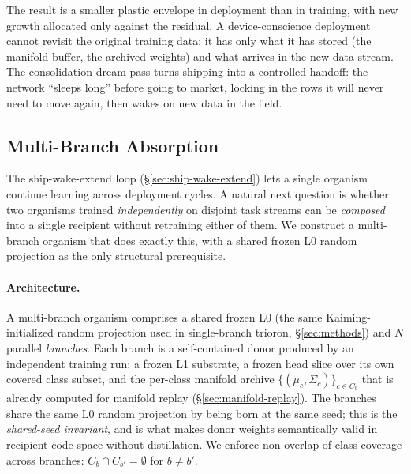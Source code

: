 \documentclass[11pt]{article}
\begin{document}
The result is a smaller plastic envelope in deployment than in training,
with new growth allocated only against the residual. A device-conscience
deployment cannot revisit the original training data: it has only what it
has stored (the manifold buffer, the archived weights) and what arrives in
the new data stream. The consolidation-dream pass turns shipping into a
controlled handoff: the network ``sleeps long'' before going to market,
locking in the rows it will never need to move again, then wakes on new
data in the field.

\subsection{Multi-Branch Absorption}
\label{sec:absorption}

The ship-wake-extend loop (\S\ref{sec:ship-wake-extend}) lets a single
organism continue learning across deployment cycles. A natural next
question is whether two organisms trained \emph{independently} on
disjoint task streams can be \emph{composed} into a single recipient
without retraining either of them. We construct a multi-branch
organism that does exactly this, with a shared frozen L0 random
projection as the only structural prerequisite.

\paragraph{Architecture.} A multi-branch organism comprises a shared
frozen L0 (the same Kaiming-initialized random projection used in
single-branch trioron, \S\ref{sec:methods}) and $N$ parallel
\emph{branches}. Each branch is a self-contained donor produced by an
independent training run: a frozen L1 substrate, a frozen head slice
over its own covered class subset, and the per-class manifold archive
$\{(\mu_c, \Sigma_c)\}_{c \in C_b}$ that is already computed for
manifold replay (\S\ref{sec:manifold-replay}). The branches share the same
L0 random projection by being born at the same seed; this is the
\emph{shared-seed invariant}, and is what makes donor weights
semantically valid in recipient code-space without distillation. We
enforce non-overlap of class coverage across branches:
$C_b \cap C_{b'} = \emptyset$ for $b \neq b'$.
\end{document}
